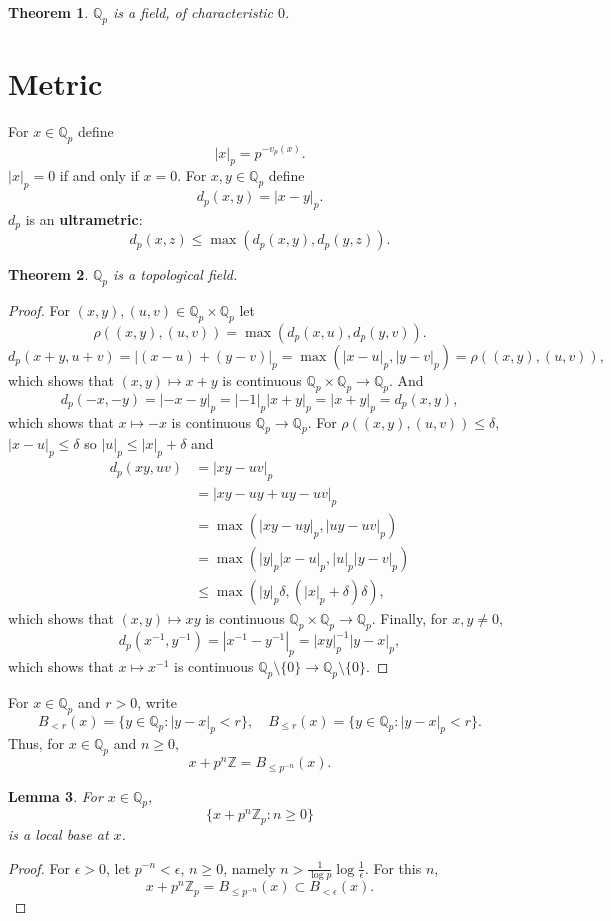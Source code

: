 \documentclass{article}
\newtheorem{theorem}{Theorem}
\newtheorem{lemma}[theorem]{Lemma}
\theoremstyle{definition}
\begin{document}
\begin{theorem}
$\mathbb{Q}_p$ is a field, of characteristic $0$.
\end{theorem}



\section{Metric}
For $x \in \mathbb{Q}_p$ define 
\[
|x|_p = p^{-v_p(x)}.
\]
$|x|_p=0$ if and only if $x=0$. For $x,y \in \mathbb{Q}_p$ define
\[
d_p(x,y) = |x-y|_p.
\]
$d_p$ is an \textbf{ultrametric}: 
\[
d_p(x,z) \leq \max(d_p(x,y),d_p(y,z)).
\]


\begin{theorem}
$\mathbb{Q}_p$ is a topological field.
\end{theorem}
\begin{proof}
For $(x,y),(u,v) \in \mathbb{Q}_p \times \mathbb{Q}_p$ let
\[
\rho((x,y),(u,v)) = \max(d_p(x,u),d_p(y,v)).
\]
\[
d_p(x+y,u+v) = |(x-u)+(y-v)|_p = \max(|x-u|_p,|y-v|_p) = \rho((x,y),(u,v)),
\]
which shows that $(x,y) \mapsto x+y$ is continuous $\mathbb{Q}_p \times \mathbb{Q}_p \to \mathbb{Q}_p$.
And
\[
d_p(-x,-y) = |-x-y|_p = |-1|_p |x+y|_p = |x+y|_p = d_p(x,y),
\]
which shows that $x \mapsto -x$ is continuous $\mathbb{Q}_p \to \mathbb{Q}_p$.
For $\rho((x,y),(u,v)) \leq \delta$, $|x-u|_p \leq \delta$ so $|u|_p \leq |x|_p +\delta$ and
\begin{align*}
d_p(xy,uv) &= |xy-uv|_p\\
&= |xy-uy+uy-uv|_p\\
&=\max(|xy-uy|_p,|uy-uv|_p)\\
&=\max(|y|_p |x-u|_p,|u|_p|y- v|_p)\\
&\leq \max(|y|_p \delta, (|x|_p+\delta)\delta),
\end{align*}
which shows that $(x,y) \mapsto xy$ is continuous $\mathbb{Q}_p \times \mathbb{Q}_p \to \mathbb{Q}_p$.
Finally, for $x,y \neq 0$,
\[
d_p(x^{-1},y^{-1}) = |x^{-1}-y^{-1}|_p = |xy|_p^{-1} |y-x|_p,
\]
which shows that $x \mapsto x^{-1}$ is continuous $\mathbb{Q}_p \setminus \{0\} \to \mathbb{Q}_p \setminus \{0\}$.
\end{proof}

For $x \in \mathbb{Q}_p$ and $r>0$, write
\[
B_{<r}(x) = \{y \in \mathbb{Q}_p: |y-x|_p<r\},
\quad 
B_{\leq r}(x) = \{y \in \mathbb{Q}_p: |y-x|_p<r\}.
\]
Thus, for $x \in \mathbb{Q}_p$ and $n \geq 0$,
\[
x+p^n \mathbb{Z} = B_{\leq p^{-n}}(x).
\]

\begin{lemma}
For $x \in \mathbb{Q}_p$, 
\[
\{x+p^n \mathbb{Z}_p: n \geq 0\}
\]
is a local base at $x$.
\label{localbase}
\end{lemma}
\begin{proof}
For $\epsilon>0$, let $p^{-n}<\epsilon$, $n \geq 0$, namely $n > \frac{1}{\log p} \log \frac{1}{\epsilon}$. For this $n$,
\[
x+p^n \mathbb{Z}_p = B_{\leq p^{-n}}(x) \subset B_{<\epsilon}(x).
\]
\end{proof}
\end{document}
